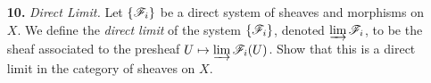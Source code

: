 \documentclass{article}
\begin{document}
\begin{enumerate} [label=\textbf{\arabic*.}, leftmargin=0em]
\begin{proof}
    Now we show $\fF \oplus \fG$ is a sheaf. Let $U$ be an open subset of $X$, and let $\{ V_i \}$ be a cover of $U$ by open sets. If $(s, t) \in \Gamma(U, \fF \oplus \fG)$, then $(\restr{s}{U_i}, \restr{t}{U_i}) = \restr{(s, t)}{U_i} = 0$ by universal property nonsense, so $s = 0$ and $t = 0$. Also, if we have elements $(s_i, t_i) \in \Gamma(V_i, \fF \oplus \fG)$ such that for all $i, j$, $\restr{(s_i, t_i)}{V_i \cap V_j} = \restr{(s_j, t_j)}{V_i \cap V_j}$, then again $(\restr{s_i}{U_i \cap U_j}, \restr{t_i}{U_i \cap U_j}) =(\restr{s_j}{U_i \cap U_j}, \restr{t_j}{U_i \cap U_j})$ if and only if $\restr{s_i}{U_i \cap U_j} = \restr{s_j}{U_i \cap U_j}$ and $\restr{t_i}{U_i \cap U_j} = \restr{t_j}{U_i \cap U_j}$, so by the sheaf properties of $\fF$ and $\fG$, there exists $s \in \Gamma(U, \fF)$ and $t \in \Gamma(U, \fG)$ such that $\restr{(s, t)}{U_i} = (s_i, t_i)$.
\end{proof}

\item[\textbf{10.}] \textit{Direct Limit.} Let $\{ \mathscr{F}_i \}$ be a direct system of sheaves and morphisms on $X$. We define the \textit{direct limit} of the system $\{ \mathscr{F}_i \}$, denoted $\varinjlim \mathscr{F}_i$, to be the sheaf associated to the presheaf $U \mapsto \varinjlim \mathscr{F}_i(U)$. Show that this is a direct limit in the category of sheaves on $X$.


\end{enumerate}
\end{document}
